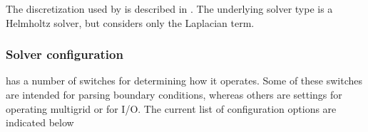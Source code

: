 \documentclass[letterpaper,10pt,english]{sphinxmanual}
\begin{document}
The discretization used by  is described in {\hyperref[\detokenize{Source/LinearSolvers:chap-linearsolvers}]{}}.
The underlying solver type is a Helmholtz solver, but  considers only the Laplacian term.


\subsubsection{Solver configuration}
\label{\detokenize{Solvers/Electrostatics:solver-configuration}}
 has a number of switches for determining how it operates.
Some of these switches are intended for parsing boundary conditions, whereas others are settings for operating multigrid or for I/O.
The current list of configuration options are indicated below
\end{document}
